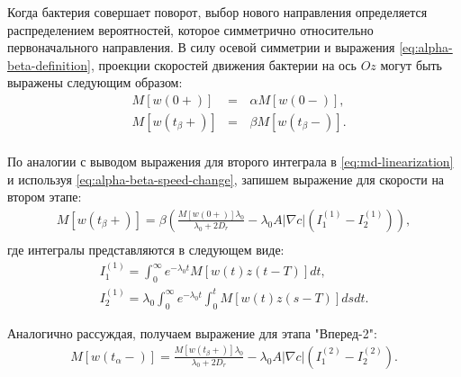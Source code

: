 Когда бактерия совершает поворот, выбор нового направления определяется распределением вероятностей, которое симметрично относительно первоначального направления. В силу осевой симметрии и выражения \cref{eq:alpha-beta-definition}, проекции скоростей движения бактерии на ось $Oz$ могут быть выражены следующим образом:
\begin{equation}
    \begin{aligned}
        &M\left [w(0+) \right ]&=&\,\alpha M\left [w(0-) \right ],\\
        &M\left [w(t_{\beta}+) \right ]& = &\,\beta M\left [w(t_{\beta}-) \right ].\\
        \label{eq:alpha-beta-speed-change}
    \end{aligned}
\end{equation}

По аналогии с выводом выражения для второго интеграла в \cref{eq:md-linearization} и используя \cref{eq:alpha-beta-speed-change}, запишем выражение для скорости на втором этапе:
\begin{equation}
    \begin{aligned}
        M\left [w(t_{\beta}+) \right ] = \beta \left ( \frac{M\left [w(0+) \right ] \lambda_0}{\lambda_0 + 2 D_r} - \lambda_0 A |\nabla c| \left (I_1^{(1)} - I_2^{(1)} \right ) \right ), \\
        \label{eq:speed-beta-equation}
    \end{aligned}
\end{equation}
где интегралы представляются в следующем виде:
\begin{equation}
    \begin{aligned}
        I_1^{(1)}=\int_0^{\infty} e^{-\lambda_0t} M\left [w(t)z(t-T) \right ]dt, \\
        I_2^{(1)}=\lambda_0 \int_0^{\infty} e^{-\lambda_0t} \int_0^{t} M\left [w(t)z(s-T) \right ]ds dt.
        \label{eq:speed-integrals}
    \end{aligned}
\end{equation}

Аналогично рассуждая, получаем выражение для этапа "Вперед-2":
\begin{equation}
    \begin{aligned}
        M\left [w(t_{\alpha}-) \right ] = \frac{M\left [w(t_{\beta}+) \right ] \lambda_0}{\lambda_0 + 2 D_r} - \lambda_0 A |\nabla c| \left (I_1^{(2)} - I_2^{(2)}\right ). \\
        \label{eq:speed-alpha-formula}
    \end{aligned}
\end{equation}

